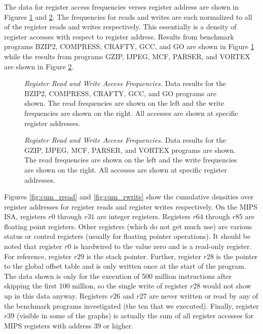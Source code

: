 \documentclass[10pt,dvips]{article}
\begin{document}
The data for register access frequencies verses register address are
shown in Figures \ref{fig:aa_rrdwr} 
and \ref{fig:ab_rrdwr}.
The frequencies for reads and writes are each normalized to 
all of the register reads and writes respectively.
This essentially is a density of register accesses with respect
to register address.
Results from benchmark programs BZIP2, COMPRESS, CRAFTY, GCC, and GO
are shown in Figure \ref{fig:aa_rrdwr} while the results
from programs GZIP, IJPEG, MCF, PARSER, and VORTEX are shown in
Figure \ref{fig:ab_rrdwr}.
%
\begin{figure}
\centering
{}
\caption{{\em Register Read and Write Access Frequencies.} 
Data results for the 
BZIP2, COMPRESS, CRAFTY, GCC, and GO programs are shown.
The read frequencies are shown on the left and the write frequencies are
shown on the right.
All accesses are shown at specific register addresses.}
\label{fig:aa_rrdwr}
\end{figure}
%
\begin{figure}
\centering
{}
\caption{{\em Register Read and Write Access Frequencies.} 
Data results for the
GZIP, IJPEG, MCF, PARSER, and VORTEX programs are shown.
The read frequencies are shown on the left and the write frequencies are
shown on the right.
All accesses are shown at specific register addresses.}
\label{fig:ab_rrdwr}
\end{figure}
%
%
Figures \ref{fig:cum_rread} and \ref{fig:cum_rwrite} show the cumulative
densities over
register addresses for register reads and register writes
respectively.  
On the MIPS ISA, registers $ r0 $ through $ r31 $ are integer registers.
Registers $ r64 $ through $ r85 $ are floating point registers.
Other registers (which do not get much use) are various status
or control registers (usually for floating pointer operations).
It should be noted that register $ r0 $ is hardwired to
the value zero and is a read-only register.
For reference, register $ r29 $ is the stack pointer.
Further, register $ r28 $ is the pointer to the global offset
table and is only written once at the start of the program.
The data shown is only for the execution of 500 million instructions
after skipping the first 100 million, so the single write of register
$ r28 $ would not show up in this data anyway.
Registers $ r26 $ and $ r27 $ are never written or read
by any of the benchmark programs investigated (the ten that we executed).
Finally, register $ r39 $ (visible in some of the graphs)
is actually the sum of all register
accesses for MIPS registers with address 39 or higher.
\end{document}
